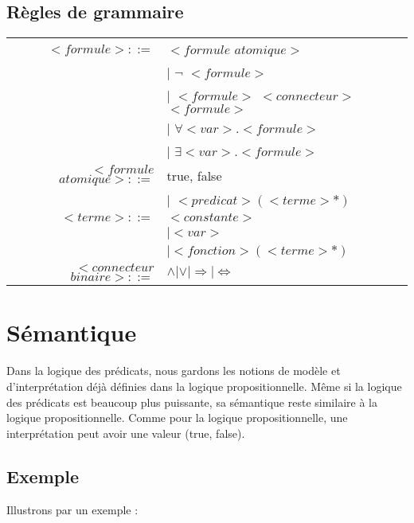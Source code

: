 \subsection{Règles de grammaire}
\begin{tabular}{rl}
$<formule>::=$ 	  &	$<formule$ $atomique>$ \\
				  & $\vert$ $\neg$ $<formule>$ \\
				  & $\vert$ $<formule>$ $<connecteur>$ $<formule>$ \\
				  & $\vert$ $\forall <var>.<formule>$ \\
				  & $\vert$ $\exists <var>.<formule>$ \\
$<formule$ $atomique>::=$ 
				  & true, false \\
				  & $\vert$ $<predicat>(<terme>*)$ \\
$<terme>::=$	  & $<constante>$ \\
				  & $\vert <var>$ \\
				  & $\vert <fonction>(<terme>*)$ \\
$<connecteur$ $binaire>::=$ 
				  & $\wedge \vert \vee \vert \Rightarrow \vert \Leftrightarrow$ \\

\end{tabular}

\section{Sémantique}

Dans la logique des prédicats, nous gardons les notions de modèle et d'interprétation déjà définies dans la logique propositionnelle. Même si la logique des prédicats est beaucoup plus puissante, sa sémantique reste similaire à la logique propositionnelle.
Comme pour la logique propositionnelle, une interprétation peut avoir une valeur (true, false).

\subsection{Exemple}
Illustrons par un exemple : 

